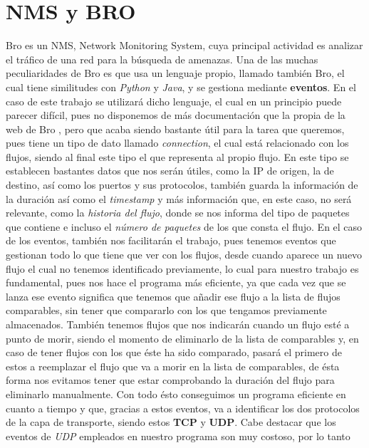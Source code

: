 \section{NMS y BRO}

Bro es un NMS, Network Monitoring System, cuya principal actividad 
es analizar el tráfico de una red para la búsqueda de amenazas. Una de 
las muchas peculiaridades de Bro es que usa un lenguaje propio, llamado 
también Bro, el cual tiene similitudes con \textit{Python} y \textit{Java}, y se gestiona 
mediante \textbf{eventos}. En el caso de este trabajo se utilizará dicho lenguaje, 
el cual en un principio puede parecer difícil, pues no disponemos de más 
documentación que la propia de la web de Bro \cite{broindex}, pero que acaba siendo 
bastante útil para la tarea que queremos, pues tiene un tipo de dato 
llamado \textit{connection}, el cual está relacionado con los flujos, siendo al 
final este tipo el que representa al propio flujo. En este tipo se establecen bastantes 
datos que nos serán útiles, como la IP de origen, la de destino, así 
como los puertos y sus protocolos, también guarda la información de la 
duración así como el \textit{timestamp} y más información que, en este caso, no 
será relevante, como la \textit{historia del flujo}, donde se nos informa del 
tipo de paquetes que contiene e incluso el \textit{número de paquetes} de los que consta el flujo.
\intro
En el caso de los eventos, también nos facilitarán el trabajo, pues tenemos 
eventos que gestionan todo lo que tiene que ver con los flujos, desde 
cuando aparece un nuevo flujo el cual no tenemos identificado previamente, 
lo cual para nuestro trabajo es fundamental, pues nos hace el programa más 
eficiente, ya que cada vez que se lanza ese evento significa que tenemos 
que añadir ese flujo a la lista de flujos comparables, sin tener que 
compararlo con los que tengamos previamente almacenados. También tenemos 
flujos que nos indicarán cuando un flujo esté a punto de morir, siendo el 
momento de eliminarlo de la lista de comparables y, en caso de tener 
flujos con los que éste ha sido comparado, pasará el primero de estos a 
reemplazar el flujo que va a morir en la lista de comparables, de ésta 
forma nos evitamos tener que estar comprobando la duración del flujo 
para eliminarlo manualmente. Con todo ésto conseguimos un programa eficiente 
en cuanto a tiempo y que, gracias a estos eventos, va a identificar los dos 
protocolos de la capa de transporte, siendo estos \textbf{TCP} y \textbf{UDP}. Cabe destacar que los 
eventos de \textit{UDP} empleados en nuestro programa son muy costoso, por lo tanto 
